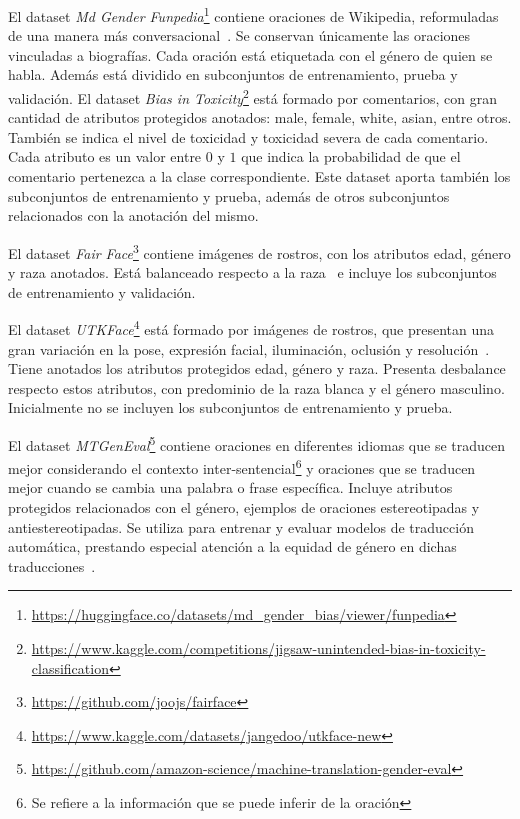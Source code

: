     El dataset \textit{Md Gender Funpedia}\footnote{\url{https://huggingface.co/datasets/md_gender_bias/viewer/funpedia}} contiene oraciones de 
    Wikipedia, reformuladas de una manera m\'as conversacional~\parencite{dinan2020multidimensional}. Se conservan \'unicamente las oraciones 
    vinculadas a biograf\'ias. Cada oraci\'on est\'a etiquetada con el g\'enero de quien se habla. Adem\'as est\'a dividido en subconjuntos de 
    entrenamiento, prueba y validaci\'on.
    El dataset \textit{Bias in Toxicity}\footnote{\url{https://www.kaggle.com/competitions/jigsaw-unintended-bias-in-toxicity-classification}}
    est\'a formado por comentarios, con gran cantidad de atributos protegidos anotados: male, female, white, asian, entre otros. Tambi\'en se 
    indica el nivel de toxicidad y toxicidad severa de cada comentario. Cada atributo es un valor entre $0$ y $1$ que indica la probabilidad de 
    que el comentario pertenezca a la clase correspondiente. Este dataset aporta tambi\'en los subconjuntos de entrenamiento y prueba, adem\'as 
    de otros subconjuntos relacionados con la anotaci\'on del mismo.  

    El dataset \textit{Fair Face}\footnote{\url{https://github.com/joojs/fairface}} contiene im\'agenes de rostros, con los atributos edad, 
    g\'enero y raza anotados. Est\'a balanceado respecto a la raza~\parencite{karkkainenfairface} e incluye los subconjuntos de entrenamiento y 
    validaci\'on.

    El dataset \textit{UTKFace}\footnote{\url{https://www.kaggle.com/datasets/jangedoo/utkface-new}} est\'a formado por im\'agenes de rostros, que 
    presentan una gran variaci\'on en la pose, expresi\'on facial, iluminaci\'on, oclusi\'on y resoluci\'on~\parencite{zhang2017age}. 
    Tiene anotados los atributos protegidos edad, g\'enero y raza. Presenta desbalance respecto estos atributos, con predominio de la raza 
    blanca y el g\'enero masculino. Inicialmente no se incluyen los subconjuntos de entrenamiento y prueba.

    El dataset \textit{MTGenEval}\footnote{\url{https://github.com/amazon-science/machine-translation-gender-eval}} contiene oraciones en 
    diferentes idiomas que se traducen mejor considerando el contexto inter-sentencial\footnote{Se refiere a la informaci\'on que se puede 
    inferir de la oraci\'on} y oraciones que se traducen mejor cuando se cambia una palabra o frase espec\'ifica. Incluye atributos protegidos 
    relacionados con el g\'enero, ejemplos de oraciones estereotipadas y antiestereotipadas. Se utiliza para entrenar y evaluar modelos de 
    traducci\'on autom\'atica, prestando especial atenci\'on a la equidad de g\'enero en dichas traducciones~\parencite{Currey2022}.

